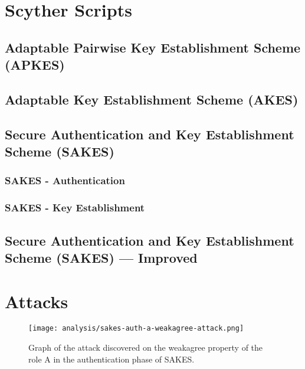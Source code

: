 \chapter{Scyther Scripts}
\label{app:listings}


\section{Adaptable Pairwise Key Establishment Scheme (APKES)}
\label{app:apkes}



\section{Adaptable Key Establishment Scheme (AKES)}
\label{app:akes}



\section{Secure Authentication and Key Establishment Scheme (SAKES)}
\label{app:sakes}

\subsection{SAKES - Authentication}
\label{app:sakes-auth}


\subsection{SAKES - Key Establishment}
\label{app:sakes-keys}
%

\section{Secure Authentication and Key Establishment Scheme (SAKES) --- Improved}
\label{app:sakes-fixed-auth}


\chapter{Attacks}

\begin{figure}[h]
	\centering
	\texttt{[image: analysis/sakes-auth-a-weakagree-attack.png]}
	\caption{Graph of the attack discovered on the weakagree property of the role A in the authentication phase of SAKES.}
	\label{fig:sakes-attack-weakagree}
\end{figure}

